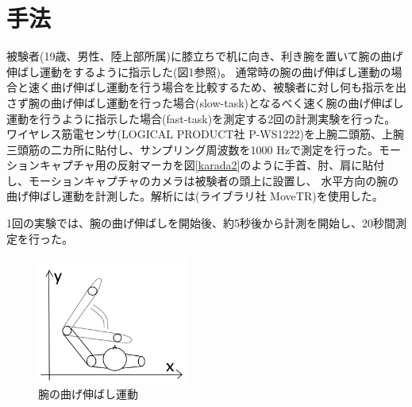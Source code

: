 \documentclass{jsarticle}
\begin{document}

\section{手法}
被験者(19歳、男性、陸上部所属)に膝立ちで机に向き、利き腕を置いて腕の曲げ伸ばし運動をするように指示した(図1参照)。
通常時の腕の曲げ伸ばし運動の場合と速く曲げ伸ばし運動を行う場合を比較するため、被験者に対し何も指示を出さず腕の曲げ伸ばし運動を行った場合(slow-task)となるべく速く腕の曲げ伸ばし運動を行うように指示した場合(fast-task)を測定する2回の計測実験を行った。
ワイヤレス筋電センサ(LOGICAL PRODUCT社 P-WS1222)を上腕二頭筋、上腕三頭筋の二カ所に貼付し、サンプリング周波数を1000 Hzで測定を行った。モーションキャプチャ用の反射マーカを図\ref{karada2}のように手首、肘、肩に貼付し、モーションキャプチャのカメラは被験者の頭上に設置し、
水平方向の腕の曲げ伸ばし運動を計測した。解析には(ライブラリ社 MoveTR)を使用した。




1回の実験では、腕の曲げ伸ばしを開始後、約5秒後から計測を開始し、20秒間測定を行った。

\begin{figure}[htb]
  \begin{center}
    \includegraphics[width=5cm]{karada1.png}
    \caption{腕の曲げ伸ばし運動}
    \label{karada1}
  \end{center}
\end{figure}
\end{document}
